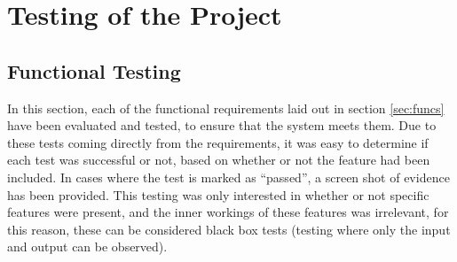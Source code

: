 \section{Testing of the Project}
\label{sec:testing}

\subsection{Functional Testing}
In this section, each of the functional requirements laid out in section \ref{sec:funcs} have been evaluated and tested, to ensure that the system meets them. Due to these tests coming directly from the requirements, it was easy to determine if each test was successful or not, based on whether or not the feature had been included. In cases where the test is marked as ``passed'', a screen shot of evidence has been provided. This testing was only interested in whether or not specific features were present, and the inner workings of these features was irrelevant, for this reason, these can be considered black box tests\cite{beizer1995black} (testing where only the input and output can be observed).\ \\
\ \\
\noindent 
